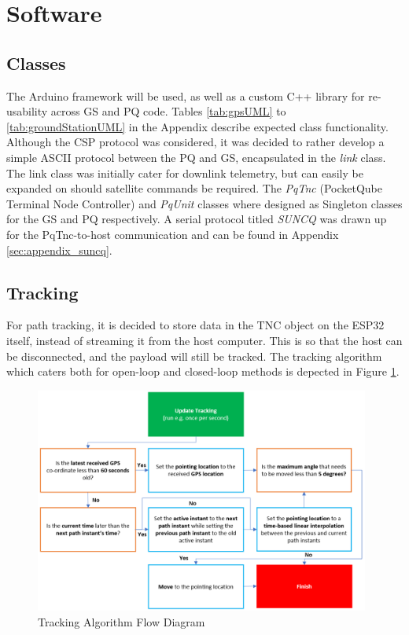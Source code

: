 \graphicspath{{./figures}}

\section{Software}

\subsection{Classes}
The Arduino framework will be used, as well as a custom C++ library for re-usability across GS and PQ code. Tables \ref{tab:gpsUML} to \ref{tab:groundStationUML} in the Appendix describe expected class functionality. Although the CSP protocol was considered, it was decided to rather develop a simple ASCII protocol between the PQ and GS, encapsulated in the \textit{link} class. The link class was initially cater for downlink telemetry, but can easily be expanded on should satellite commands be required. The \textit{PqTnc} (PocketQube Terminal Node Controller) and \textit{PqUnit} classes where designed as Singleton classes for the GS and PQ respectively. A serial protocol titled \textit{SUNCQ} was drawn up for the PqTnc-to-host communication and can be found in Appendix \ref{sec:appendix_suncq}.

\subsection{Tracking}
For path tracking, it is decided to store data in the TNC object on the ESP32 itself, instead of streaming it from the host computer. This is so that the host can be disconnected, and the payload will still be tracked. The tracking algorithm which caters both for open-loop and closed-loop methods is depected in Figure \ref{fig:trackingAlgorithm}.

\begin{figure}[!htb]
  \centering
  \includegraphics[width=0.98\textwidth]{trackingAlgorithm}
  \caption{Tracking Algorithm Flow Diagram}
  \label{fig:trackingAlgorithm}
\end{figure}